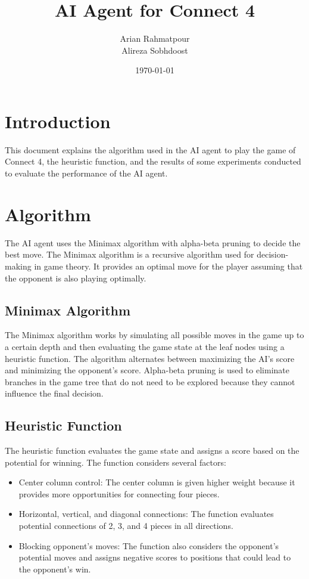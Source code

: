 \documentclass{article}
\title{AI Agent for Connect 4}
\author{Arian Rahmatpour \\ Alireza Sobhdoost}
\date{\today}
\begin{document}
\maketitle

\section{Introduction}
This document explains the algorithm used in the AI agent to play the game of Connect 4, the heuristic function, and the results of some experiments conducted to evaluate the performance of the AI agent.

\section{Algorithm}
The AI agent uses the Minimax algorithm with alpha-beta pruning to decide the best move. The Minimax algorithm is a recursive algorithm used for decision-making in game theory. It provides an optimal move for the player assuming that the opponent is also playing optimally.

\subsection{Minimax Algorithm}
The Minimax algorithm works by simulating all possible moves in the game up to a certain depth and then evaluating the game state at the leaf nodes using a heuristic function. The algorithm alternates between maximizing the AI's score and minimizing the opponent's score. Alpha-beta pruning is used to eliminate branches in the game tree that do not need to be explored because they cannot influence the final decision.

\subsection{Heuristic Function}
The heuristic function evaluates the game state and assigns a score based on the potential for winning. The function considers several factors:
\begin{itemize}
    \item Center column control: The center column is given higher weight because it provides more opportunities for connecting four pieces.
    \item Horizontal, vertical, and diagonal connections: The function evaluates potential connections of 2, 3, and 4 pieces in all directions.
    \item Blocking opponent's moves: The function also considers the opponent's potential moves and assigns negative scores to positions that could lead to the opponent's win.
\end{itemize}
\end{document}
